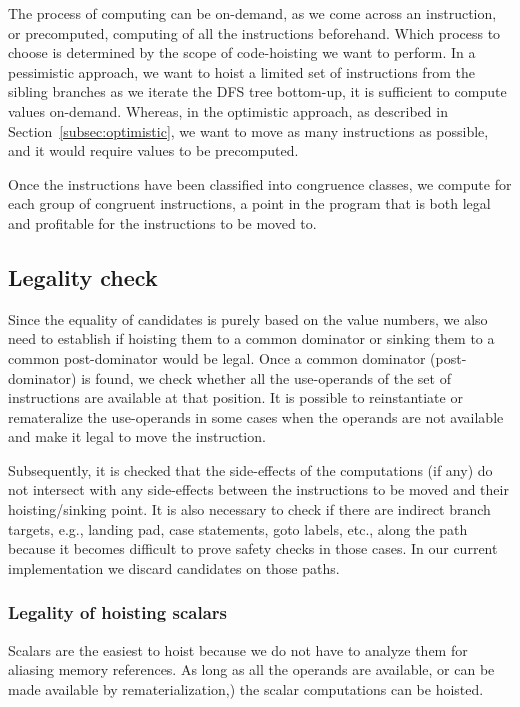 \documentclass[sigplan,10pt,review,anonymous]{acmart}\settopmatter{printfolios=true,printccs=false,printacmref=false}
\begin{document}
The process of computing \GVN{} can be on-demand, as we come across an
instruction, or precomputed, computing \GVN{} of all the instructions
beforehand. Which process to choose is determined by the scope of code-hoisting
we want to perform. In a pessimistic approach, we want to hoist a limited set of
instructions from the sibling branches as we iterate the DFS tree bottom-up, it
is sufficient to compute \GVN{} values on-demand. Whereas, in the optimistic
approach, as described in Section~\ref{subsec:optimistic}, we want to move as
many instructions as possible, and it would require \GVN{} values to be
precomputed.

Once the instructions have been classified into congruence classes, we compute
for each group of congruent instructions, a point in the program that is both
legal and profitable for the instructions to be moved to.

\subsection{Legality check}
\label{subsec:legality}
Since the equality of candidates is purely based on the value numbers, we also
need to establish if hoisting them to a common dominator or sinking them to a
common post-dominator would be legal. Once a common dominator (post-dominator)
is found, we check whether all the use-operands of the set of instructions are
available at that position. It is possible to reinstantiate or remateralize the
use-operands in some cases when the operands are not available and make it legal
to move the instruction.

Subsequently, it is checked that the side-effects of the computations (if any)
do not intersect with any side-effects between the instructions to be
moved and their hoisting/sinking point. It is also necessary to check if
there are indirect branch targets, e.g., landing pad, case statements, goto
labels, etc., along the path because it becomes difficult to prove safety checks
in those cases. In our current implementation we discard candidates on those
paths.

\subsubsection{Legality of hoisting scalars}
Scalars are the easiest to hoist because we do not have to analyze them for
aliasing memory references. As long as all the operands are available, or can be
made available by rematerialization,) the scalar computations can be hoisted.
\end{document}
